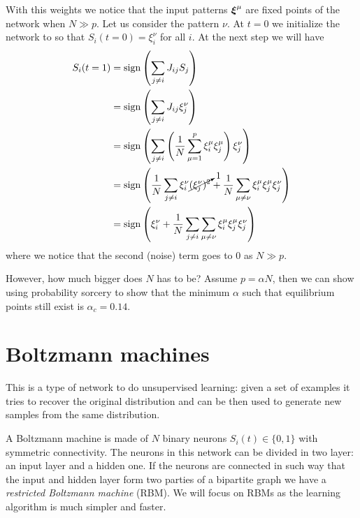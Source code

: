 \documentclass[12pt]{extarticle}
\renewcommand{\vec}[1]{\bvec{#1}}
\begin{document}
With this weights we notice that the input patterns $\vec \xi^\mu$ are fixed points of the network
when $N \gg p$.
Let us consider the pattern $\nu$.
At $t = 0$ we initialize the network to so that $S_i(t=0) = \xi^\nu_i$ for all $i$.
At the next step we will have
\begin{align}
	S_i(t=1) & = \mathrm{sign}\left( \sum_{j \neq i} J_{ij} S_j \right)                                                                                                        \\
	         & = \mathrm{sign}\left( \sum_{j \neq i} J_{ij} \xi^\nu_j \right)                                                                                                  \\
	         & = \mathrm{sign}\left( \sum_{j \neq i} \left(\frac{1}{N} \sum_{\mu = 1}^p \xi_i^\mu \xi_j^\mu\right) \xi^\nu_j \right)                                           \\
	         & = \mathrm{sign}\left( \frac{1}{N} \sum_{j \neq i} \xi^\nu_i \cancelto{1}{(\xi^\nu_j)^2} + \frac{1}{N} \sum_{\mu \neq \nu} \xi_i^\mu \xi_j^\mu \xi^\nu_j \right) \\
	         & = \mathrm{sign}\left( \xi^\nu_i + \frac{1}{N} \sum_{j \neq i} \sum_{\mu \neq \nu} \xi_i^\mu \xi_j^\mu \xi^\nu_j \right)
\end{align}
where we notice that the second (noise) term goes to $0$ as $N \gg p$.

However, how much bigger does $N$ has to be?
Assume $p = \alpha N$, then we can show using probability sorcery to show that the minimum $\alpha$
such that equilibrium points still exist is $\alpha_c = 0.14$.

\section{Boltzmann machines}
This is a type of network to do unsupervised learning: given a set of examples it tries to recover
the original distribution and can be then used to generate new samples from the same distribution.

A Boltzmann machine is made of $N$ binary neurons $S_i(t) \in \{0, 1\}$ with symmetric connectivity.
The neurons in this network can be divided in two layer: an input layer and a hidden one.
If the neurons are connected in such way that the input and hidden layer form two parties of a
bipartite graph we have a \emph{restricted Boltzmann machine} (RBM).
We will focus on RBMs as the learning algorithm is much simpler and faster.
\end{document}
